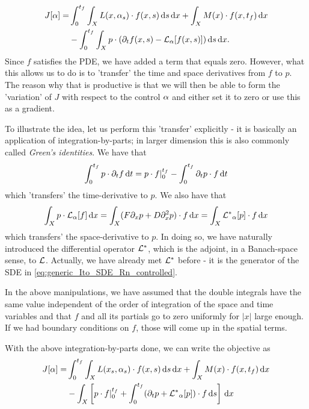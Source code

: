 \begin{align*}
J[\alpha] =& \int_0^{ t_f }\int_X L(x, \alpha_s) \cdot f(x,s) \, \mathrm{d} s\, \mathrm{d} x 
+ \int_X  M(x)\cdot f(x,{ t_f }) \, \mathrm{d} x
\\ &- \int_0^{ t_f }\int_X p \cdot ({\partial}_t f(x,s)  - { \mathcal{L} }_{\alpha} [f(x,s)] )
\, \mathrm{d} s\, \mathrm{d} x. 
\end{align*}
Since $f$ satisfies the PDE, we have added a term that equals zero. 
However, what this allows us to do is to 'transfer' the time and space
derivatives from $f$ to $p$. The reason why
that is productive is that we will then be able to form the 'variation'
of $J$ with respect to the control $\alpha$ and either set it to zero or use this as
a gradient. 

To illustrate the idea, let us perform this 'transfer' explicitly - it is basically an
application of integration-by-parts; in larger dimension this is also commonly
called {\sl Green's identities}.  We have that $$
 \int_0^{ t_f }   p \cdot {\partial}_t f   \, \mathrm{d} t =
  p\cdot f|_0^{ t_f } - \int_0^{ t_f }   {\partial}_t p \cdot   f  \, \mathrm{d} t
$$ which 'transfers' the time-derivative to $p$. We also have that $$ \int_X  p \cdot 
{ \mathcal{L} }_{\alpha} [f ]  \, \mathrm{d} x = \int_X  ( F  {\partial}_x p + D {\partial}_x^2 p) \cdot  f  \, \mathrm{d} x =
\int_X   { { \mathcal{L} }^* }_{\alpha} [p] \cdot f  \, \mathrm{d} x $$ which transfers' the
space-derivative to $p$. In doing so, we have  naturally introduced 
 the differential operator ${ { \mathcal{L} }^* }$, which is the adjoint, in a Banach-space
 sense, to ${ \mathcal{L} }$. Actually, we have already met ${ { \mathcal{L} }^* }$ before - it is the
 generator of the SDE in \cref{eq:generic_Ito_SDE_Rn_controlled}.

In the above manipulations, we have assumed that the double integrals have the
same value independent of the order of integration of the space and time
variables  and that $f$ and all its partials go to zero uniformly for $|x|$
large enough. If we had boundary conditions on $f$, those will come up in the
spatial terms.

With the above integration-by-parts done, we can write the objective as
\begin{align}
J[\alpha] =& \int_0^{ t_f }\int_X L(x_s, \alpha_s) \cdot f(x,s) \, \mathrm{d} s\, \mathrm{d} x 
+ \int_X  M(x)\cdot f(x,{ t_f }) \, \mathrm{d} x \notag
\\ &- 
\int_X  \left[ p\cdot f|_0^{ t_f }  +
    \int_0^{ t_f }  ({\partial}_t p  + { { \mathcal{L} }^* }_{\alpha} [p]) \cdot f  \, \mathrm{d} s \right] \, \mathrm{d} x 
\label{eq:generic_objective_functional_in_terms_of_forward_density_adjointed}
\end{align}

